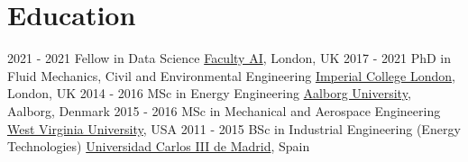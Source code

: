 \documentclass[print]{cv-style}          %
\begin{document}
\section{Education}
\begin{entrylist}
\vspace{-0.4cm}
\entry
{2021 - 2021}
{Fellow in Data Science}
{\href{https://faculty.ai/}{Faculty AI}, London, UK}
{\jobtitle{}}
\vspace{-0.3cm}
\entry
{2017 - 2021}
{PhD in Fluid Mechanics, Civil and Environmental Engineering}
{\href{https://www.imperial.ac.uk/}{Imperial College London}, London, UK}
{\jobtitle{}}
\vspace{-0.3cm}
\entry
{2014 - 2016}
{MSc in Energy Engineering}
{\href{https://www.en.aau.dk/}{Aalborg University}, Aalborg, Denmark}
{\jobtitle{}}
\vspace{-0.3cm}
\entry
{2015 - 2016}
{MSc in Mechanical and Aerospace Engineering}
{\href{https://www.wvu.edu/}{West Virginia University}, USA}
{\jobtitle{}}
\vspace{-0.3cm}
\entry
{2011 - 2015}
{BSc in Industrial Engineering (Energy Technologies)}
{\href{https://www.uc3m.es/}{Universidad Carlos III de Madrid}, Spain}
{\jobtitle{}}
\end{entrylist}
\vspace{-0.4cm}
\end{document}
